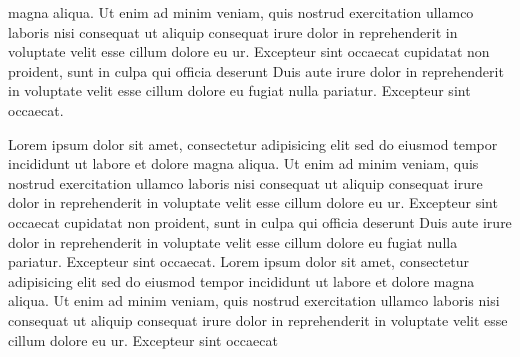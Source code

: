 \documentclass[a4paper, oneside, notitlepage, 12pt]{article}
\begin{document}
\begin{pages}
\begin{Leftside}
magna aliqua. Ut enim ad minim veniam, quis nostrud
exercitation ullamco laboris nisi
 consequat ut aliquip consequat\pend[]
 irure dolor in reprehenderit
in voluptate velit esse cillum dolore eu ur. Excepteur sint occaecat
cupidatat non proident, sunt in culpa qui officia deserunt
Duis aute irure dolor in reprehenderit
in voluptate velit esse cillum dolore eu fugiat nulla
pariatur. Excepteur sint occaecat.
\pend

Lorem ipsum dolor sit amet, consectetur adipisicing elit
sed do eiusmod tempor incididunt ut labore et dolore
magna aliqua. Ut enim ad minim veniam, quis nostrud
exercitation ullamco laboris nisi
 consequat ut aliquip consequat\pend[]
 irure dolor in reprehenderit
in voluptate velit esse cillum dolore eu ur. Excepteur sint occaecat
cupidatat non proident, sunt in culpa qui officia deserunt
Duis aute irure dolor in reprehenderit
in voluptate velit esse cillum dolore eu fugiat nulla
pariatur. Excepteur sint occaecat.
\pend
{}
Lorem ipsum dolor sit amet, consectetur adipisicing elit
sed do eiusmod tempor incididunt ut labore et dolore
magna aliqua. Ut enim ad minim veniam, quis nostrud
exercitation ullamco laboris nisi
 consequat ut aliquip consequat\pend[]
 irure dolor in reprehenderit
in voluptate velit esse cillum dolore eu ur. Excepteur sint occaecat

\end{Leftside}
\end{pages}
\end{document}
